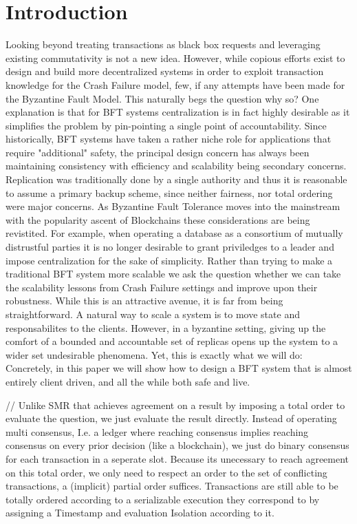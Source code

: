 \section{Introduction}





Looking beyond treating transactions as black box requests and leveraging existing commutativity is not a new idea. However, while copious efforts exist to design and build more decentralized systems in order to exploit transaction knowledge for the Crash Failure model, few, if any attempts have been made for the Byzantine Fault Model. This naturally begs the question why so? One explanation is that for BFT systems centralization is in fact highly desirable as it simplifies the problem by pin-pointing a single point of accountability. Since historically, BFT systems have taken a rather niche role for applications that require "additional" safety, the principal design concern has always been maintaining consistency with efficiency and scalability being secondary concerns. Replication was traditionally done by a single authority and thus it is reasonable to assume a primary backup scheme, since neither fairness, nor total ordering were major concerns. As Byzantine Fault Tolerance moves into the mainstream with the popularity ascent of Blockchains these considerations are being revistited. For example, when operating a database as a consortium of mutually distrustful parties it is no longer desirable to grant priviledges to a leader and impose centralization for the sake of simplicity.
Rather than trying to make a traditional BFT system more scalable we ask the question whether we can take the scalability lessons from Crash Failure settings and improve upon their robustness. While this is an attractive avenue, it is far from being straightforward. A natural way to scale a system is to move state and responsabilites to the clients.  
However, in a byzantine setting, giving up the comfort of a bounded and accountable set of replicas opens up the system to a wider set undesirable phenomena. Yet, this is exactly what we will do: Concretely, in this paper we will show how to design a BFT system that is almost entirely client driven, and all the while both safe and live. 


// Unlike SMR that achieves agreement on a result by imposing a total order to evaluate the question, we just evaluate the result directly. Instead of operating multi consensus, I.e. a ledger where reaching consensus implies reaching consensus on every prior decision (like a blockchain), we just do binary consensus for each transaction in a seperate slot. Because its unecessary to reach agreement on this total order, we only need to respect an order to the set of conflicting transactions, a (implicit) partial order suffices.
 Transactions are still able to be totally ordered according to a serializable execution they correspond to by assigning a Timestamp and evaluation Isolation according to it.

